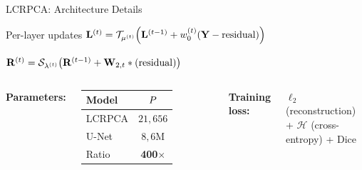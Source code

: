 \begin{frame}{LCRPCA: Architecture Details \skipbadge{}}

  \begin{shibuiframe}{Per-layer updates}
    \small
    $\mathbf{L}^{(t)} = \mathcal{T}_{\mu^{(t)}}\!\left(\mathbf{L}^{(t-1)} + w_0^{(t)}(\mathbf{Y} - \text{residual})\right)$

    $\mathbf{R}^{(t)} = \mathcal{S}_{\lambda^{(t)}}\!\left(\mathbf{R}^{(t-1)} + \mathbf{W}_{2,t}\ast(\text{residual})\right)$
  \end{shibuiframe}

  \vspace{0.3em}
  \begin{columns}[T]
      \small
      \textbf{Parameters:}

      \vspace{0.2em}
      \renewcommand{\arraystretch}{1.1}
      \begin{tabular}{lc}
        \toprule
        \textbf{Model} & $P$ \\
        \midrule
        LCRPCA & $21{,}656$ \\
        U-Net & $8{,}6\mathrm{M}$ \\
        \midrule
        Ratio & \textbf{400$\times$} \\
        \bottomrule
      \end{tabular}

      \small
      \textbf{Training loss:}

      \vspace{0.2em}
      $\ell_2$ (reconstruction) + $\mathcal{H}$ (cross-entropy) + Dice
  \end{columns}
\end{frame}

